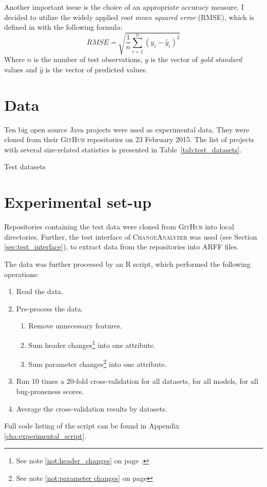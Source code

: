 \documentclass{pracamgr}
\newcommand{\ca}{\textsc{ChangeAnalyzer}\xspace}
\begin{document}
Another important issue is the choice of an appropriate accuracy measure. I decided to utilize the widely applied \emph{root mean squared error} (RMSE), which is defined in \cite{rmse} with the following formula:
\[
RMSE = \sqrt{\frac{1}{n} \sum\limits_{i=1}^{n}\left(y_i - \hat{y}_i\right)^{2}}
\]
\noindent Where $n$ is the number of test observations, $y$ is the vector of \emph{gold standard} values and $\hat{y}$ is the vector of predicted values.

\section{Data}
\label{sec:data}
Ten big open source Java projects were used as experimental data. They were cloned from their \textsc{GitHub} repositories on 23 February 2015. The list of projects with several size-related statistics is presented in Table~\ref{tab:test_datasets}.

\begin{table}[H]
\centering
\caption{Test datasets}
\label{tab:test_datasets}

\end{table}

\section{Experimental set-up}
\label{sec:set-up}
Repositories containing the test data were cloned from \textsc{GitHub} into local directories. Further, the test interface of \ca was used (see Section \ref{sec:test_interface}), to extract data from the repositories into ARFF files.

The data was further processed by an R script, which performed the following operations:
\begin{enumerate}[itemsep=0.5pt]
	\item Read the data.
	\item Pre-process the data.
	\begin{enumerate}[label={\arabic{enumi}.\arabic*},topsep=0pt]
		\item Remove unnecessary features.
		\item Sum header changes\footnote{See note \ref{not:header_changes} on page \pageref{not:header_changes}.} into one attribute.
		\item Sum parameter changes\footnote{See note \ref{not:parameter changes} on page \pageref{not:parameter changes}} into one attribute.
	\end{enumerate}
	\item Run 10 times a 20-fold cross-validation for all datasets, for all models, for all bug-proneness scores.
	\item Average the cross-validation results by datasets.
\end{enumerate}
Full code listing of the script can be found in Appendix \ref{cha:experimental_script}.
\end{document}
